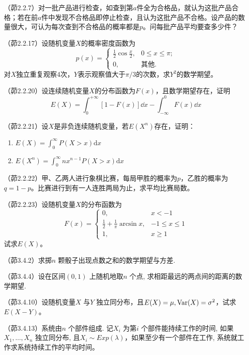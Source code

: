 \begin{problemset}[错题记录]
    \item （茆2.2.7）对一批产品进行检查，如查到第$a$件全为合格品，就认为这批产品合格；若在前$a$件中发现不合格品即停止检查，且认为这批产品不合格。设产品的数量很大，可认为每次查到不合格品的概率都是$p$。问每批产品平均要查多少件？
    \item （茆2.2.17）设随机变量$X$的概率密度函数为
    \[ p(x)=\begin{cases}
            \frac{1}{2} \cos \frac{x}{2}, & 0 \leq x \leq \pi; \\
            0,                            & \text{其他}.
        \end{cases} \]
    对$X$独立重复观察4次，$Y$表示观察值大于$\pi/3$的次数，求$Y^2$的数学期望。
    \item （茆2.2.20）设连续随机变量$X$的分布函数为$F(x)$，且数学期望存在，证明
    \[ E(X) = \int_{0}^{+\infty}[1-F(x)] \dd  x-\int_{-\infty}^{0} F(x) \dd  x \]
    \item （茆2.2.21）设$X$是非负连续随机变量，若$E(X^n)$存在，证明：\begin{enumerate}
        \item$E(X)=\int_0^{\infty}P(X>x) \mathrm{d}x$
        \item$E(X^n)=\int_0^{\infty}n x^{n-1}P(X>x) \mathrm{d}x$
    \end{enumerate}
    \item （茆2.2.22）甲、乙两人进行象棋比赛，每局甲胜的概率为$p$，乙胜的概率为$q=1-p$。比赛进行到有一人连胜两局为止，求平均比赛局数。
    \item （茆2.2.23）设随机变量$X$的分布函数为
    \[ F(x)=\begin{cases}
            0,                                  & x<-1         \\
            \frac{1}{2}+\frac{1}{\pi}\arcsin x, & -1\le x\le 1 \\
            1,                                  & x\ge 1
        \end{cases} \]
    试求$E(X)$。
    \item （茆3.4.2）求掷$n$ 颗骰子出现点数之和的数学期望与方差.
    \item （茆3.4.4）设在区间$(0,1)$ 上随机地取$n$ 个点, 求相距最远的两点间的距离的数学期望.
    \item （茆3.4.10）设随机变量$X$ 与$Y$ 独立同分布，且$E(X)=\mu, \operatorname{Var}(X)=\sigma^2$，试求$E(X-Y)$。
    \item （茆3.4.13）系统由$n$ 个部件组成. 记$X_i$ 为第$i$ 个部件能持续工作的时间, 如果$X_1,\ldots,X_n$ 独立同分布, 且$X_i\sim Exp(\lambda)$，如果至少有一个部件在工作, 系统就工作求系统持续工作的平均时间。

\end{problemset}
